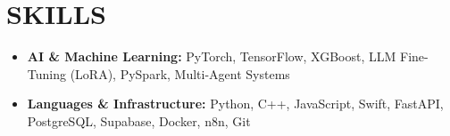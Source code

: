 \documentclass[letterpaper,11pt]{article}
\newcommand{\cvitem}[1]{
  \item\small{
    {#1\vspace{-2pt}}
  }
}
\newcommand{\cvitemstart}{\begin{itemize}\justifying}
\newcommand{\cvitemend}{\end{itemize}\vspace{-5pt}}
\begin{document}
\section{\textbf{SKILLS}}
\cvitemstart
    \cvitem{\textbf{AI \& Machine Learning:} PyTorch, TensorFlow, XGBoost, LLM Fine-Tuning (LoRA), PySpark, Multi-Agent Systems}
    \cvitem{\textbf{Languages \& Infrastructure:} Python, C++, JavaScript, Swift, FastAPI, PostgreSQL, Supabase, Docker, n8n, Git}
  \cvitemend
\end{document}
